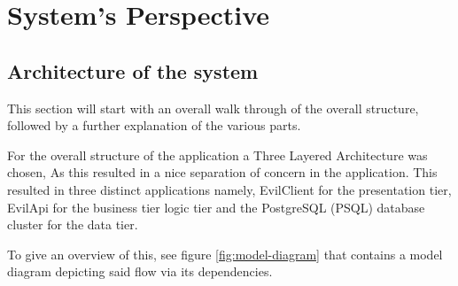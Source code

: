 \documentclass[report/main.tex]{subfiles}
\begin{document}
    \section{System's Perspective}
    \label{Sec:systems_perspective}
    
    \subsection{Architecture of the system}
    \label{subsec:architecture_of_system}
        
        
        This section will start with an overall walk through of the overall structure, followed by a further explanation of the various parts.
        
        For the overall structure of the application a Three Layered Architecture was chosen, As this resulted in a nice separation of concern in the application. This resulted in three distinct applications namely, EvilClient for the presentation tier, EvilApi for the business tier logic tier and the PostgreSQL (PSQL) database cluster for the data tier.
        
        To give an overview of this, see figure \ref{fig:model-diagram} that contains a model diagram depicting said flow via its dependencies.
        
\end{document}
